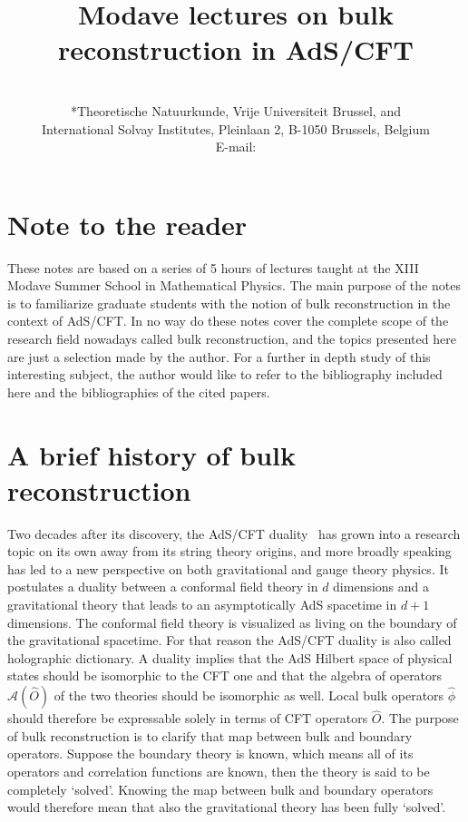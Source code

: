 \documentclass{PoS}
\title{Modave lectures on bulk reconstruction in AdS/CFT}
\author{\speaker{Tim De Jonckheere}\\
        *Theoretische Natuurkunde, Vrije Universiteit Brussel, and \\ International Solvay Institutes,
Pleinlaan 2, B-1050 Brussels, Belgium \\
        E-mail: \email{tim.de.jonckheere@vub.be}}
\newcommand{\Am}{\ensuremath{\mathcal{A}}}
\begin{document}
\section*{Note to the reader}
These notes are based on a series of 5 hours of lectures taught at the XIII Modave Summer School in Mathematical Physics. The main purpose of the notes is to familiarize graduate students with the notion of bulk reconstruction in the context of AdS/CFT. In no way do these notes cover the complete scope of the research field nowadays called bulk reconstruction, and the topics presented here are just a selection made by the author. For a further in depth study of this interesting subject, the author would like to refer to the bibliography included here and the bibliographies of the cited papers. 

\section{A brief history of bulk reconstruction}

Two decades after its discovery, the AdS/CFT duality~\cite{Maldacena:1997re,Witten:1998qj} has grown into a research topic on its own away from its string theory origins, and more broadly speaking has led to a new perspective on both gravitational and gauge theory physics. It postulates a duality between a conformal field theory in $d$ dimensions and a gravitational theory that leads to an asymptotically AdS spacetime in $d+1$ dimensions. The conformal field theory is visualized as living on the boundary of the gravitational spacetime. For that reason the AdS/CFT duality is also called holographic dictionary. A duality implies that the AdS Hilbert space of physical states should be isomorphic to the CFT one and that the algebra of operators $\Am(\hat{O})$ of the two theories should be isomorphic as well. Local bulk operators $\hat{\phi}$ should therefore be expressable solely in terms of CFT operators $\hat{O}$. The purpose of bulk reconstruction is to clarify that map between bulk and boundary operators. Suppose the boundary theory is known, which means all of its operators and correlation functions are known, then the theory is said to be completely `solved'. Knowing the map between bulk and boundary operators would therefore mean that also the gravitational theory has been fully `solved'.\\
\end{document}
